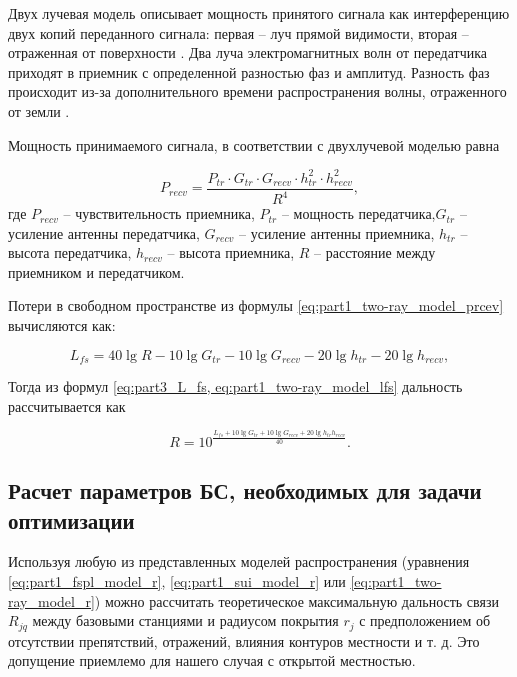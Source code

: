 Двух лучевая модель описывает мощность принятого сигнала как интерференцию двух копий переданного сигнала: первая -- луч прямой видимости, вторая -- отраженная от поверхности \cite{Gaitan2020}. 
Два луча электромагнитных волн от передатчика приходят в приемник с определенной разностью фаз и амплитуд. Разность фаз происходит из-за дополнительного времени распространения волны, отраженного от земли \cite{Rademacher2016, Bacco2014, Zochmann2017, Kurt2017}. 


Мощность принимаемого сигнала, в соответствии с двухлучевой моделью равна

\begin{equation}
  \label{eq:part1_two-ray_model_prcev}
  P_{recv} = \frac{P_{tr} \cdot G_{tr} \cdot G_{recv} \cdot h^2_{tr} \cdot h^2_{recv}}{R^4},
\end{equation}
где $P_{recv}$ -- чувствительность приемника, $P_{tr}$ -- мощность передатчика,$G_{tr}$ -- усиление антенны передатчика, $G_{recv}$ -- усиление антенны приемника, $h_{tr}$ -- высота передатчика, $h_{recv}$ -- высота приемника, $R$ -- расстояние между приемником и передатчиком.

Потери в свободном пространстве из формулы \cref{eq:part1_two-ray_model_prcev} вычисляются как:

\begin{equation}
  \label{eq:part1_two-ray_model_lfs}
  L_{fs} = 40\lg{R} - 10\lg{G_{tr}} - 10\lg{G_{recv}} - 20\lg{h_{tr}} - 20\lg{h_{recv}},
\end{equation}

Тогда из формул \cref{eq:part3_L_fs, eq:part1_two-ray_model_lfs} дальность рассчитывается как

\begin{equation}
  \label{eq:part1_two-ray_model_r}
  R = 10^\frac{L_{fs} + 10\lg{G_{tr}} + 10\lg{G_{recv}} + 20\lg{h_{tr}h_{recv}}}{40}.
\end{equation}



\subsection{Расчет параметров БС, необходимых для задачи оптимизации}

Используя любую из представленных моделей распространения (уравнения \cref{eq:part1_fspl_model_r}, \cref{eq:part1_sui_model_r} или \cref{eq:part1_two-ray_model_r}) можно рассчитать теоретическое максимальную дальность связи $ R_{jq}$ между базовыми станциями и радиусом покрытия $ r_j $ с предположением об отсутствии препятствий, отражений, влияния контуров местности и т. д. Это допущение приемлемо для нашего случая с открытой местностью.

